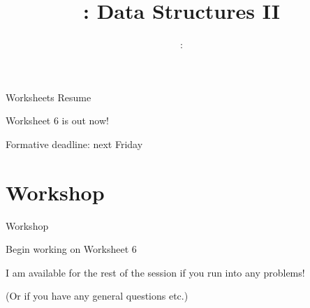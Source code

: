 \usepackage{../../beamerthemeFalmouthGamesAcademy}
\usepackage{multimedia}
\graphicspath{ {../../} }

\lstset{language=[Sharp]C
}

\usepackage[normalem]{ulem}
\usepackage{wasysym}

\usepackage{algpseudocode}

\usepackage{pdfpages}

\usetikzlibrary{arrows,automata}
\usetikzlibrary{tikzmark,calc}




\title{\sessionnumber: Data Structures II}
\subtitle{\modulecode: \moduletitle}

\frame{\titlepage} 

\begin{frame}{Worksheets Resume}
    \begin{center}
        Worksheet 6 is out now!

        Formative deadline: next Friday
    \end{center}
\end{frame}

%


%

%
%

\part{Workshop}
\frame{\partpage}

\begin{frame}{Workshop}
    \begin{center}
        Begin working on Worksheet 6

        I am available for the rest of the session if you run into any problems!

        (Or if you have any general questions etc.)
    \end{center}
\end{frame}



